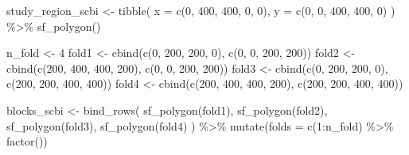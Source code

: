 \documentclass[12pt]{article}
\newenvironment{Shaded}{\begin{snugshade}}{\end{snugshade}}
\newcommand{\AttributeTok}[1]{\textcolor[rgb]{0.77,0.63,0.00}{#1}}
\newcommand{\DecValTok}[1]{\textcolor[rgb]{0.00,0.00,0.81}{#1}}
\newcommand{\FunctionTok}[1]{\textcolor[rgb]{0.00,0.00,0.00}{#1}}
\newcommand{\NormalTok}[1]{#1}
\newcommand{\OtherTok}[1]{\textcolor[rgb]{0.56,0.35,0.01}{#1}}
\newcommand{\SpecialCharTok}[1]{\textcolor[rgb]{0.00,0.00,0.00}{#1}}
\begin{document}
\begin{Shaded}
\begin{Highlighting}[]
\NormalTok{study\_region\_scbi }\OtherTok{\textless{}{-}} \FunctionTok{tibble}\NormalTok{(}
  \AttributeTok{x =} \FunctionTok{c}\NormalTok{(}\DecValTok{0}\NormalTok{, }\DecValTok{400}\NormalTok{, }\DecValTok{400}\NormalTok{, }\DecValTok{0}\NormalTok{, }\DecValTok{0}\NormalTok{),}
  \AttributeTok{y =} \FunctionTok{c}\NormalTok{(}\DecValTok{0}\NormalTok{, }\DecValTok{0}\NormalTok{, }\DecValTok{400}\NormalTok{, }\DecValTok{400}\NormalTok{, }\DecValTok{0}\NormalTok{)}
\NormalTok{) }\SpecialCharTok{\%\textgreater{}\%}
  \FunctionTok{sf\_polygon}\NormalTok{()}

\NormalTok{n\_fold }\OtherTok{\textless{}{-}} \DecValTok{4}
\NormalTok{fold1 }\OtherTok{\textless{}{-}} \FunctionTok{cbind}\NormalTok{(}\FunctionTok{c}\NormalTok{(}\DecValTok{0}\NormalTok{, }\DecValTok{200}\NormalTok{, }\DecValTok{200}\NormalTok{, }\DecValTok{0}\NormalTok{), }\FunctionTok{c}\NormalTok{(}\DecValTok{0}\NormalTok{, }\DecValTok{0}\NormalTok{, }\DecValTok{200}\NormalTok{, }\DecValTok{200}\NormalTok{))}
\NormalTok{fold2 }\OtherTok{\textless{}{-}} \FunctionTok{cbind}\NormalTok{(}\FunctionTok{c}\NormalTok{(}\DecValTok{200}\NormalTok{, }\DecValTok{400}\NormalTok{, }\DecValTok{400}\NormalTok{, }\DecValTok{200}\NormalTok{), }\FunctionTok{c}\NormalTok{(}\DecValTok{0}\NormalTok{, }\DecValTok{0}\NormalTok{, }\DecValTok{200}\NormalTok{, }\DecValTok{200}\NormalTok{))}
\NormalTok{fold3 }\OtherTok{\textless{}{-}} \FunctionTok{cbind}\NormalTok{(}\FunctionTok{c}\NormalTok{(}\DecValTok{0}\NormalTok{, }\DecValTok{200}\NormalTok{, }\DecValTok{200}\NormalTok{, }\DecValTok{0}\NormalTok{), }\FunctionTok{c}\NormalTok{(}\DecValTok{200}\NormalTok{, }\DecValTok{200}\NormalTok{, }\DecValTok{400}\NormalTok{, }\DecValTok{400}\NormalTok{))}
\NormalTok{fold4 }\OtherTok{\textless{}{-}} \FunctionTok{cbind}\NormalTok{(}\FunctionTok{c}\NormalTok{(}\DecValTok{200}\NormalTok{, }\DecValTok{400}\NormalTok{, }\DecValTok{400}\NormalTok{, }\DecValTok{200}\NormalTok{), }\FunctionTok{c}\NormalTok{(}\DecValTok{200}\NormalTok{, }\DecValTok{200}\NormalTok{, }\DecValTok{400}\NormalTok{, }\DecValTok{400}\NormalTok{))}

\NormalTok{blocks\_scbi }\OtherTok{\textless{}{-}} \FunctionTok{bind\_rows}\NormalTok{(}
  \FunctionTok{sf\_polygon}\NormalTok{(fold1), }\FunctionTok{sf\_polygon}\NormalTok{(fold2), }\FunctionTok{sf\_polygon}\NormalTok{(fold3),}
  \FunctionTok{sf\_polygon}\NormalTok{(fold4)}
\NormalTok{) }\SpecialCharTok{\%\textgreater{}\%}
  \FunctionTok{mutate}\NormalTok{(}\AttributeTok{folds =} \FunctionTok{c}\NormalTok{(}\DecValTok{1}\SpecialCharTok{:}\NormalTok{n\_fold) }\SpecialCharTok{\%\textgreater{}\%} \FunctionTok{factor}\NormalTok{())}


\end{Highlighting}
\end{Shaded}
\end{document}
